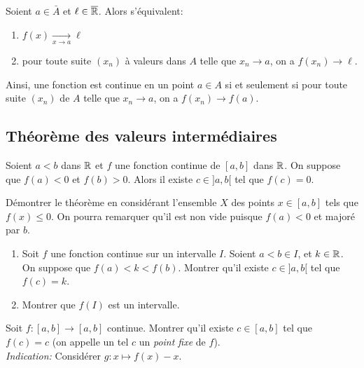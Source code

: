 \documentclass[../main.tex]{subfiles}
\begin{document}
\begin{prop}\label{caractCVfct}
    Soient $a\in\bar{A}$ et $\ell\in\overline{\mathbb R}$. Alors s'équivalent:
    \begin{enumerate}
        \item $f(x)\xrightarrow[x\to a]{}\ell$
        \item pour toute suite $(x_n)$ à valeurs dans $A$ telle que $x_n\longrightarrow a$, on a $f(x_n)\longrightarrow \ell$.
    \end{enumerate}
\end{prop}

Ainsi, une fonction est continue en un point $a\in A$ si et seulement si pour toute suite $(x_n)$ de $A$ telle que $x_n\longrightarrow a$, on a $f(x_n)\longrightarrow f(a)$.

\subsection{Théorème des valeurs intermédiaires}

\begin{thm}
    Soient $a<b$ dans $\mathbb R$ et $f$ une fonction continue de $[a,b]$ dans $\mathbb R$. On suppose que $f(a)<0$ et $f(b)>0$. Alors il existe $c\in{]a,b[}$ tel que $f(c)=0$.
\end{thm}

\begin{exo}[Démonstration, D]
	Démontrer le théorème en considérant l'ensemble $X$ des points $x\in[a,b]$ tels que $f(x)\leq 0$. On pourra remarquer qu'il est non vide puisque $f(a)<0$ et majoré par $b$.
\end{exo}

\begin{exo}[M]\leavevmode
	\begin{enumerate}
		\item Soit $f$ une fonction continue sur un intervalle $I$. Soient $a<b\in I$, et $k\in\mathbb R$. On suppose que $f(a)<k<f(b)$. Montrer qu'il existe $c\in{]a,b[}$ tel que $f(c)=k$.
		\item Montrer que $f(I)$ est un intervalle.
	\end{enumerate}
\end{exo}

\begin{exo}[M]
	Soit $f:[a,b]\longrightarrow[a,b]$ continue. Montrer qu'il existe $c\in[a,b]$ tel que $f(c)=c$ (on appelle un tel $c$ un \textit{point fixe} de $f$).\\
	\textit{Indication:} Considérer $g:x\longmapsto f(x)-x$.
\end{exo}
\end{document}
